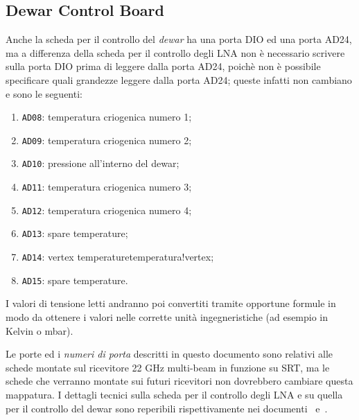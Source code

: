 \subsection{Dewar Control Board}
Anche la scheda per il controllo del \emph{dewar} ha una porta DIO ed una porta AD24, ma a differenza 
della scheda per il controllo degli LNA non \`e necessario scrivere sulla porta DIO prima di 
leggere dalla porta AD24, poich\`e non \`e possibile specificare quali grandezze leggere dalla porta
AD24; queste infatti non cambiano e sono le seguenti:
\begin{enumerate}
\item \texttt{AD08}: temperatura criogenica numero 1;
\item \texttt{AD09}: temperatura criogenica numero 2;
\item \texttt{AD10}: pressione all'interno del dewar;
\item \texttt{AD11}: temperatura criogenica numero 3;
\item \texttt{AD12}: temperatura criogenica numero 4;  
\item \texttt{AD13}: spare temperature;
\item \texttt{AD14}: vertex temperature{temperatura!vertex};
\item \texttt{AD15}: spare temperature.
\end{enumerate}
I valori di tensione letti andranno poi convertiti tramite opportune formule in modo da ottenere i valori
nelle corrette unit\`a ingegneristiche (ad esempio in Kelvin o mbar).

Le porte ed i \emph{numeri di porta} descritti in questo documento sono relativi 
alle schede montate sul ricevitore
22 GHz multi-beam in funzione su SRT, ma le schede che verranno montate sui futuri ricevitori non dovrebbero
cambiare questa mappatura. I dettagli tecnici sulla scheda per il controllo degli LNA e su quella per
il controllo del dewar sono reperibili rispettivamente nei documenti~\cite{lna-controls}
e~\cite{dewar-controls}.

